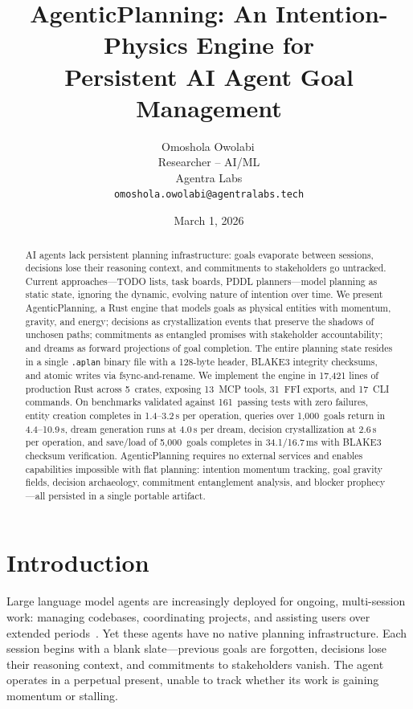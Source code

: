 \documentclass[10pt, twocolumn]{article}
\title{\textbf{AgenticPlanning: An Intention-Physics Engine for\\Persistent AI Agent Goal Management}}
\author{Omoshola Owolabi\,\orcidlink{0009-0006-4089-0732}\\Researcher -- AI/ML\\Agentra Labs\\\texttt{omoshola.owolabi@agentralabs.tech}}
\date{March 1, 2026}
\begin{document}
\maketitle
\thispagestyle{fancy}

\begin{abstract}
AI agents lack persistent planning infrastructure: goals evaporate between sessions, decisions lose their reasoning context, and commitments to stakeholders go untracked. Current approaches---TODO lists, task boards, PDDL planners---model planning as static state, ignoring the dynamic, evolving nature of intention over time. We present AgenticPlanning, a Rust engine that models goals as physical entities with momentum, gravity, and energy; decisions as crystallization events that preserve the shadows of unchosen paths; commitments as entangled promises with stakeholder accountability; and dreams as forward projections of goal completion. The entire planning state resides in a single \texttt{.aplan} binary file with a 128-byte header, BLAKE3 integrity checksums, and atomic writes via fsync-and-rename. We implement the engine in 17{,}421 lines of production Rust across 5~crates, exposing 13~MCP tools, 31~FFI exports, and 17~CLI commands. On benchmarks validated against 161~passing tests with zero failures, entity creation completes in 1.4--3.2\,\textmu s per operation, queries over 1{,}000~goals return in 4.4--10.9\,\textmu s, dream generation runs at 4.0\,\textmu s per dream, decision crystallization at 2.6\,\textmu s per operation, and save/load of 5{,}000~goals completes in 34.1/16.7\,ms with BLAKE3 checksum verification. AgenticPlanning requires no external services and enables capabilities impossible with flat planning: intention momentum tracking, goal gravity fields, decision archaeology, commitment entanglement analysis, and blocker prophecy---all persisted in a single portable artifact.
\end{abstract}

\section{Introduction}
\label{sec:intro}

Large language model agents are increasingly deployed for ongoing, multi-session work: managing codebases, coordinating projects, and assisting users over extended periods~\cite{vaswani2017attention, park2023generative}. Yet these agents have no native planning infrastructure. Each session begins with a blank slate---previous goals are forgotten, decisions lose their reasoning context, and commitments to stakeholders vanish. The agent operates in a perpetual present, unable to track whether its work is gaining momentum or stalling.
\end{document}
